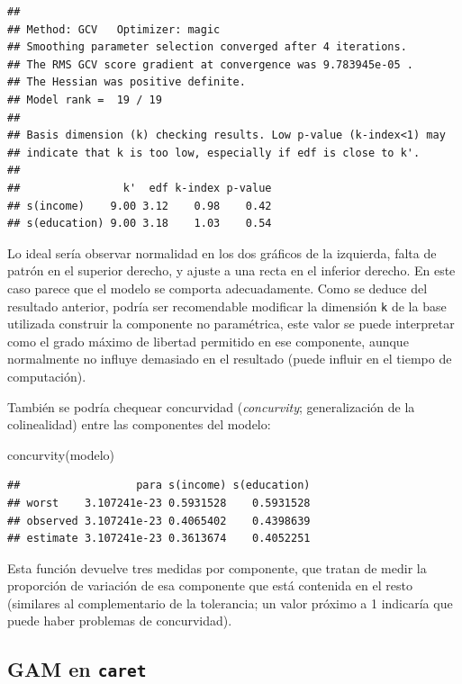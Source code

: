 \documentclass[
  spanish,
]{book}
\newenvironment{Shaded}{\begin{snugshade}}{\end{snugshade}}
\newcommand{\FunctionTok}[1]{\textcolor[rgb]{0.00,0.00,0.00}{#1}}
\newcommand{\NormalTok}[1]{#1}
\theoremstyle{break}
\theoremstyle{definition}
\theoremstyle{definition}
\theoremstyle{definition}
\theoremstyle{definition}
\theoremstyle{remark}
\begin{document}
\begin{verbatim}
## 
## Method: GCV   Optimizer: magic
## Smoothing parameter selection converged after 4 iterations.
## The RMS GCV score gradient at convergence was 9.783945e-05 .
## The Hessian was positive definite.
## Model rank =  19 / 19 
## 
## Basis dimension (k) checking results. Low p-value (k-index<1) may
## indicate that k is too low, especially if edf is close to k'.
## 
##                k'  edf k-index p-value
## s(income)    9.00 3.12    0.98    0.42
## s(education) 9.00 3.18    1.03    0.54
\end{verbatim}

Lo ideal sería observar normalidad en los dos gráficos de la izquierda, falta de patrón en el superior derecho, y ajuste a una recta en el inferior derecho. En este caso parece que el modelo se comporta adecuadamente.
Como se deduce del resultado anterior, podría ser recomendable modificar la dimensión \texttt{k} de la base utilizada construir la componente no paramétrica, este valor se puede interpretar como el grado máximo de libertad permitido en ese componente, aunque normalmente no influye demasiado en el resultado (puede influir en el tiempo de computación).

También se podría chequear concurvidad (\emph{concurvity}; generalización de la colinealidad) entre las componentes del modelo:

\begin{Shaded}
\begin{Highlighting}[]
\FunctionTok{concurvity}\NormalTok{(modelo)}
\end{Highlighting}
\end{Shaded}

\begin{verbatim}
##                  para s(income) s(education)
## worst    3.107241e-23 0.5931528    0.5931528
## observed 3.107241e-23 0.4065402    0.4398639
## estimate 3.107241e-23 0.3613674    0.4052251
\end{verbatim}

Esta función devuelve tres medidas por componente, que tratan de medir la proporción de variación de esa componente que está contenida en el resto (similares al complementario de la tolerancia; un valor próximo a 1 indicaría que puede haber problemas de concurvidad).

\hypertarget{gam-en-caret}{%
\subsection{\texorpdfstring{GAM en \texttt{caret}}{GAM en caret}}\label{gam-en-caret}}
\end{document}
